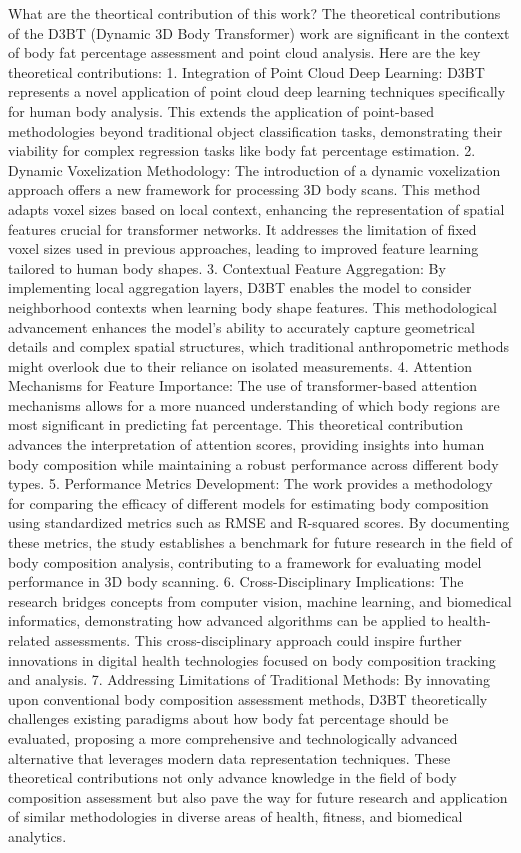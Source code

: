 \documentclass[conference, 12pt]{IEEEtran}
\begin{document}
What are the theortical contribution of this work?
The theoretical contributions of the D3BT (Dynamic 3D Body Transformer) work are significant in the context of body fat percentage assessment and point cloud analysis. Here are the key theoretical contributions:
1. Integration of Point Cloud Deep Learning: D3BT represents a novel application of point cloud deep learning techniques specifically for human body analysis. This extends the application of point-based methodologies beyond traditional object classification tasks, demonstrating their viability for complex regression tasks like body fat percentage estimation.
2. Dynamic Voxelization Methodology: The introduction of a dynamic voxelization approach offers a new framework for processing 3D body scans. This method adapts voxel sizes based on local context, enhancing the representation of spatial features crucial for transformer networks. It addresses the limitation of fixed voxel sizes used in previous approaches, leading to improved feature learning tailored to human body shapes.
3. Contextual Feature Aggregation: By implementing local aggregation layers, D3BT enables the model to consider neighborhood contexts when learning body shape features. This methodological advancement enhances the model's ability to accurately capture geometrical details and complex spatial structures, which traditional anthropometric methods might overlook due to their reliance on isolated measurements.
4. Attention Mechanisms for Feature Importance: The use of transformer-based attention mechanisms allows for a more nuanced understanding of which body regions are most significant in predicting fat percentage. This theoretical contribution advances the interpretation of attention scores, providing insights into human body composition while maintaining a robust performance across different body types.
5. Performance Metrics Development: The work provides a methodology for comparing the efficacy of different models for estimating body composition using standardized metrics such as RMSE and R-squared scores. By documenting these metrics, the study establishes a benchmark for future research in the field of body composition analysis, contributing to a framework for evaluating model performance in 3D body scanning.
6. Cross-Disciplinary Implications: The research bridges concepts from computer vision, machine learning, and biomedical informatics, demonstrating how advanced algorithms can be applied to health-related assessments. This cross-disciplinary approach could inspire further innovations in digital health technologies focused on body composition tracking and analysis.
7. Addressing Limitations of Traditional Methods: By innovating upon conventional body composition assessment methods, D3BT theoretically challenges existing paradigms about how body fat percentage should be evaluated, proposing a more comprehensive and technologically advanced alternative that leverages modern data representation techniques.
These theoretical contributions not only advance knowledge in the field of body composition assessment but also pave the way for future research and application of similar methodologies in diverse areas of health, fitness, and biomedical analytics.
\end{document}
